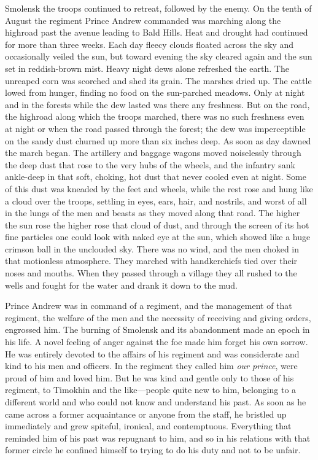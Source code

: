  Smolensk the troops continued to retreat, followed by the
enemy. On the tenth of August the regiment Prince Andrew
commanded was marching along the highroad past the avenue leading
to Bald Hills. Heat and drought had continued for more than three
weeks. Each day fleecy clouds floated across the sky and
occasionally veiled the sun, but toward evening the sky cleared
again and the sun set in reddish-brown mist.  Heavy night dews
alone refreshed the earth. The unreaped corn was scorched and
shed its grain. The marshes dried up. The cattle lowed from
hunger, finding no food on the sun-parched meadows. Only at night
and in the forests while the dew lasted was there any
freshness. But on the road, the highroad along which the troops
marched, there was no such freshness even at night or when the
road passed through the forest; the dew was imperceptible on the
sandy dust churned up more than six inches deep. As soon as day
dawned the march began. The artillery and baggage wagons moved
noiselessly through the deep dust that rose to the very hubs of
the wheels, and the infantry sank ankle-deep in that soft,
choking, hot dust that never cooled even at night. Some of this
dust was kneaded by the feet and wheels, while the rest rose and
hung like a cloud over the troops, settling in eyes, ears, hair,
and nostrils, and worst of all in the lungs of the men and beasts
as they moved along that road. The higher the sun rose the higher
rose that cloud of dust, and through the screen of its hot fine
particles one could look with naked eye at the sun, which showed
like a huge crimson ball in the unclouded sky. There was no wind,
and the men choked in that motionless atmosphere. They marched
with handkerchiefs tied over their noses and mouths. When they
passed through a village they all rushed to the wells and fought
for the water and drank it down to the mud.

Prince Andrew was in command of a regiment, and the management of
that regiment, the welfare of the men and the necessity of
receiving and giving orders, engrossed him. The burning of
Smolensk and its abandonment made an epoch in his life. A novel
feeling of anger against the foe made him forget his own
sorrow. He was entirely devoted to the affairs of his regiment
and was considerate and kind to his men and officers. In the
regiment they called him \emph{our prince}, were proud of him and
loved him. But he was kind and gentle only to those of his
regiment, to Timokhin and the like---people quite new to him,
belonging to a different world and who could not know and
understand his past. As soon as he came across a former
acquaintance or anyone from the staff, he bristled up immediately
and grew spiteful, ironical, and contemptuous. Everything that
reminded him of his past was repugnant to him, and so in his
relations with that former circle he confined himself to trying
to do his duty and not to be unfair.

